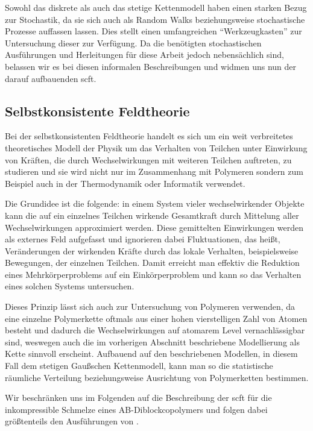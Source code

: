 Sowohl das diskrete als auch das stetige Kettenmodell haben einen starken Bezug zur Stochastik, da sie sich auch als Random Walks beziehungsweise stochastische Prozesse auffassen lassen.
Dies stellt einen umfangreichen \enquote{Werkzeugkasten} zur Untersuchung dieser zur Verfügung.
Da die benötigten stochastischen Ausführungen und Herleitungen für diese Arbeit jedoch nebensächlich sind, belassen wir es bei diesen informalen Beschreibungen und widmen uns nun der darauf aufbauenden \ac{scft}.


\subsection*{Selbstkonsistente Feldtheorie} %

Bei der selbstkonsistenten Feldtheorie handelt es sich um ein weit verbreitetes theoretisches Modell der Physik um das Verhalten von Teilchen unter Einwirkung von Kräften, die durch Wechselwirkungen mit weiteren Teilchen auftreten, zu studieren und sie wird nicht nur im Zusammenhang mit Polymeren sondern zum Beispiel auch in der Thermodynamik oder Informatik verwendet.

Die Grundidee ist die folgende: in einem System vieler wechselwirkender Objekte kann die auf ein einzelnes Teilchen wirkende Gesamtkraft durch Mittelung aller Wechselwirkungen approximiert werden.
Diese gemittelten Einwirkungen werden als externes Feld aufgefasst und ignorieren dabei Fluktuationen, das heißt, Veränderungen der wirkenden Kräfte durch das lokale Verhalten, beispielsweise Bewegungen, der einzelnen Teilchen.
Damit erreicht man effektiv die Reduktion eines Mehrkörperproblems auf ein Einkörperproblem und kann so das Verhalten eines solchen Systems untersuchen.

Dieses Prinzip lässt sich auch zur Untersuchung von Polymeren verwenden,
da eine einzelne Polymerkette oftmals aus einer hohen vierstelligen Zahl von Atomen besteht und dadurch die Wechselwirkungen auf atomarem Level vernachlässigbar sind, weswegen auch die im vorherigen Abschnitt beschriebene Modellierung als Kette sinnvoll erscheint.
Aufbauend auf den beschriebenen Modellen, in diesem Fall dem stetigen Gaußschen Kettenmodell, kann man so die statistische räumliche Verteilung beziehungsweise Ausrichtung von Polymerketten bestimmen.

Wir beschränken uns im Folgenden auf die Beschreibung der \ac{scft} für die inkompressible Schmelze eines AB-Diblockcopolymers und folgen dabei größtenteils den Ausführungen von \textcite{Matsen:1994bz,Stasiak:2011ba}.

